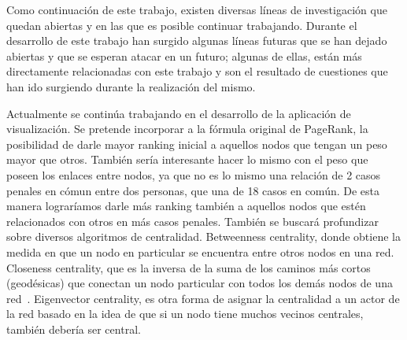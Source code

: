 Como continuación de este trabajo, existen diversas líneas de investigación que quedan abiertas y en las que es posible continuar trabajando. Durante el desarrollo de este trabajo han surgido algunas líneas futuras que se han dejado abiertas y que se esperan atacar en un futuro; algunas de ellas, están más directamente relacionadas con este trabajo y son el resultado de cuestiones que han ido surgiendo durante la realización del mismo.

Actualmente se 	continúa trabajando en el desarrollo de la aplicación de visualización. Se pretende incorporar a la fórmula original de PageRank, la posibilidad de darle mayor ranking inicial a aquellos nodos que tengan un peso mayor que otros. También sería interesante hacer lo mismo con el peso que poseen los enlaces entre nodos, ya que no es lo mismo una relación de 2 casos penales en cómun entre dos personas, que una de 18 casos en común. De esta manera lograríamos darle más ranking también a aquellos nodos que estén relacionados con otros en más casos penales. También se buscará profundizar sobre diversos algoritmos de centralidad. Betweenness centrality, donde obtiene la medida en que un nodo en particular se encuentra entre otros nodos en una red. Closeness centrality, que es la inversa de la suma de los caminos más cortos (geodésicas) que conectan un nodo particular con todos los demás nodos de una red~\cite{newman2005measure}. Eigenvector centrality, es otra forma de asignar la centralidad a un actor de la red basado en la idea de que si un nodo tiene muchos vecinos centrales, también debería ser central.
 